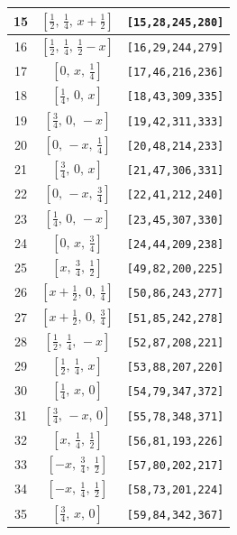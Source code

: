 \documentclass[fleqn,8pt]{jsarticle}
\begin{document}
\begin{longtable}{ccc}
15 & $\left[ \frac{1}{2},\, \frac{1}{4},\, x + \frac{1}{2} \right]$ & {\tt [15,28,245,280]} \\ \hline
16 & $\left[ \frac{1}{2},\, \frac{1}{4},\, \frac{1}{2} - x \right]$ & {\tt [16,29,244,279]} \\ \hline
17 & $\left[ 0,\, x,\, \frac{1}{4} \right]$ & {\tt [17,46,216,236]} \\ \hline
18 & $\left[ \frac{1}{4},\, 0,\, x \right]$ & {\tt [18,43,309,335]} \\ \hline
19 & $\left[ \frac{3}{4},\, 0,\, - x \right]$ & {\tt [19,42,311,333]} \\ \hline
20 & $\left[ 0,\, - x,\, \frac{1}{4} \right]$ & {\tt [20,48,214,233]} \\ \hline
21 & $\left[ \frac{3}{4},\, 0,\, x \right]$ & {\tt [21,47,306,331]} \\ \hline
22 & $\left[ 0,\, - x,\, \frac{3}{4} \right]$ & {\tt [22,41,212,240]} \\ \hline
23 & $\left[ \frac{1}{4},\, 0,\, - x \right]$ & {\tt [23,45,307,330]} \\ \hline
24 & $\left[ 0,\, x,\, \frac{3}{4} \right]$ & {\tt [24,44,209,238]} \\ \hline
25 & $\left[ x,\, \frac{3}{4},\, \frac{1}{2} \right]$ & {\tt [49,82,200,225]} \\ \hline
26 & $\left[ x + \frac{1}{2},\, 0,\, \frac{1}{4} \right]$ & {\tt [50,86,243,277]} \\ \hline
27 & $\left[ x + \frac{1}{2},\, 0,\, \frac{3}{4} \right]$ & {\tt [51,85,242,278]} \\ \hline
28 & $\left[ \frac{1}{2},\, \frac{1}{4},\, - x \right]$ & {\tt [52,87,208,221]} \\ \hline
29 & $\left[ \frac{1}{2},\, \frac{1}{4},\, x \right]$ & {\tt [53,88,207,220]} \\ \hline
30 & $\left[ \frac{1}{4},\, x,\, 0 \right]$ & {\tt [54,79,347,372]} \\ \hline
31 & $\left[ \frac{3}{4},\, - x,\, 0 \right]$ & {\tt [55,78,348,371]} \\ \hline
32 & $\left[ x,\, \frac{1}{4},\, \frac{1}{2} \right]$ & {\tt [56,81,193,226]} \\ \hline
33 & $\left[ - x,\, \frac{3}{4},\, \frac{1}{2} \right]$ & {\tt [57,80,202,217]} \\ \hline
34 & $\left[ - x,\, \frac{1}{4},\, \frac{1}{2} \right]$ & {\tt [58,73,201,224]} \\ \hline
35 & $\left[ \frac{3}{4},\, x,\, 0 \right]$ & {\tt [59,84,342,367]} \\ \hline

\end{longtable}
\end{document}
